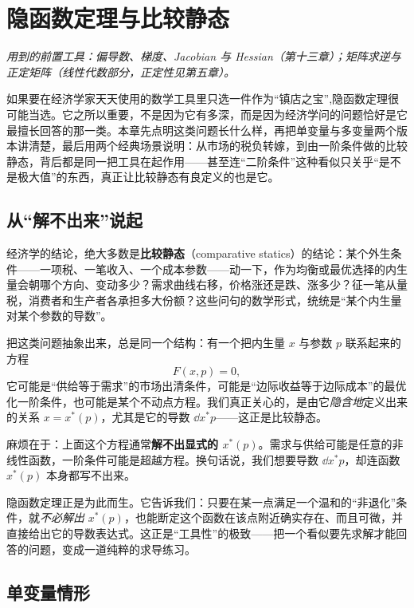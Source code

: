 \chapter{隐函数定理与比较静态}
\label{ch:ift}

\noindent\emph{用到的前置工具：偏导数、梯度、Jacobian 与 Hessian（第十三章）；矩阵求逆与正定矩阵（线性代数部分，正定性见第五章）。}
\medskip

如果要在经济学家天天使用的数学工具里只选一件作为``镇店之宝'',隐函数定理很可能当选。它之所以重要，不是因为它有多深，而是因为经济学问的问题恰好是它最擅长回答的那一类。本章先点明这类问题长什么样，再把单变量与多变量两个版本讲清楚，最后用两个经典场景说明：从市场的税负转嫁，到由一阶条件做的比较静态，背后都是同一把工具在起作用——甚至连``二阶条件''这种看似只关乎``是不是极大值''的东西，真正让比较静态有良定义的也是它。

\section{从``解不出来''说起}
\label{sec:ift-motivation}

经济学的结论，绝大多数是\textbf{比较静态}（comparative statics）的结论：某个外生条件——一项税、一笔收入、一个成本参数——动一下，作为均衡或最优选择的内生量会朝哪个方向、变动多少？需求曲线右移，价格涨还是跌、涨多少？征一笔从量税，消费者和生产者各承担多大份额？这些问句的数学形式，统统是``某个内生量对某个参数的导数''。

把这类问题抽象出来，总是同一个结构：有一个把内生量 $x$ 与参数 $p$ 联系起来的方程
\[
    F(x,p)=0 ,
\]
它可能是``供给等于需求''的市场出清条件，可能是``边际收益等于边际成本''的最优化一阶条件，也可能是某个不动点方程。我们真正关心的，是由它\emph{隐含地}定义出来的关系 $x=x^*(p)$，尤其是它的导数 $\dd{x^*}{p}$——这正是比较静态。

麻烦在于：上面这个方程通常\textbf{解不出显式的 $x^*(p)$}。需求与供给可能是任意的非线性函数，一阶条件可能是超越方程。换句话说，我们想要导数 $\dd{x^*}{p}$，却连函数 $x^*(p)$ 本身都写不出来。

隐函数定理正是为此而生。它告诉我们：只要在某一点满足一个温和的``非退化''条件，就\emph{不必解出} $x^*(p)$，也能断定这个函数在该点附近确实存在、而且可微，并直接给出它的导数表达式。这正是``工具性''的极致——把一个看似要先求解才能回答的问题，变成一道纯粹的求导练习。

\section{单变量情形}
\label{sec:ift-univariate}

